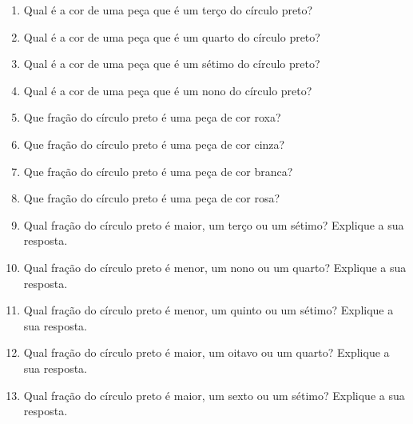 \documentclass[10 pt,usenames,dvipsnames, oneside]{article}
\begin{document}
\begin{enumerate}[label=\alph*)]
   \item  Qual é a cor de uma peça que é um terço do círculo preto?
  \item  Qual é a cor  de uma peça que é  um quarto do círculo preto?
  \item  Qual é  a cor de uma peça que é um sétimo do círculo preto?
  \item  Qual é a cor de uma peça que é  um nono do círculo preto?
  \item  Que fração do círculo preto é uma peça de cor roxa?
  \item  Que fração do círculo preto é uma peça de cor cinza?
  \item  Que fração do círculo preto é uma peça de cor branca?
  \item  Que fração do círculo preto é uma peça de cor rosa?
  \item  Qual fração do círculo preto é maior, um terço ou um sétimo? Explique a sua resposta.
  \item  Qual fração do círculo preto é menor, um nono ou um quarto? Explique a sua resposta.
  \item  Qual fração do círculo preto é menor, um quinto ou um sétimo? Explique a sua resposta.
  \item  Qual fração do círculo preto é maior, um oitavo ou um quarto? Explique a sua resposta.
  \item  Qual fração do círculo preto é maior, um sexto ou um sétimo? Explique a sua resposta.
\end{enumerate}

\ifdefined\prof
\end{document}
